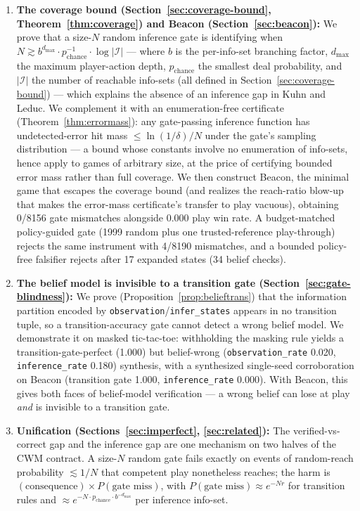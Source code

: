 \documentclass[11pt]{article}
\theoremstyle{remark}
\newcommand{\dmax}{d_{\max}}
\newcommand{\Ireach}{\mathcal{I}}
\begin{document}
\begin{enumerate}
\item \textbf{The coverage bound (Section~\ref{sec:coverage-bound}, Theorem~\ref{thm:coverage}) and Beacon (Section~\ref{sec:beacon}):} We prove that a size-$N$ random inference gate is identifying when $N \gtrsim b^{\dmax} \cdot p_{\text{chance}}^{-1} \cdot \log|\Ireach|$ --- where $b$ is the per-info-set branching factor, $\dmax$ the maximum player-action depth, $p_{\text{chance}}$ the smallest deal probability, and $|\Ireach|$ the number of reachable info-sets (all defined in Section~\ref{sec:coverage-bound}) --- which explains the absence of an inference gap in Kuhn and Leduc. We complement it with an enumeration-free certificate (Theorem~\ref{thm:errormass}): any gate-passing inference function has undetected-error hit mass $\leq \ln(1/\delta)/N$ under the gate's sampling distribution --- a bound whose constants involve no enumeration of info-sets, hence apply to games of arbitrary size, at the price of certifying bounded error mass rather than full coverage. We then construct Beacon, the minimal game that escapes the coverage bound (and realizes the reach-ratio blow-up that makes the error-mass certificate's transfer to play vacuous), obtaining 0/8156 gate mismatches alongside 0.000 play win rate. A budget-matched policy-guided gate (1999 random plus one trusted-reference play-through) rejects the same instrument with 4/8190 mismatches, and a bounded policy-free falsifier rejects after 17 expanded states (34 belief checks).

\item \textbf{The belief model is invisible to a transition gate (Section~\ref{sec:gate-blindness}):} We prove (Proposition~\ref{prop:belieftrans}) that the information partition encoded by \texttt{observation}/\texttt{infer\_states} appears in no transition tuple, so a transition-accuracy gate cannot detect a wrong belief model. We demonstrate it on masked tic-tac-toe: withholding the masking rule yields a transition-gate-perfect (1.000) but belief-wrong (\texttt{observation\_rate} 0.020, \texttt{inference\_rate} 0.180) synthesis, with a synthesized single-seed corroboration on Beacon (transition gate 1.000, \texttt{inference\_rate} 0.000). With Beacon, this gives both faces of belief-model verification --- a wrong belief can lose at play \emph{and} is invisible to a transition gate.

\item \textbf{Unification (Sections~\ref{sec:imperfect}, \ref{sec:related}):} The verified-vs-correct gap and the inference gap are one mechanism on two halves of the CWM contract. A size-$N$ random gate fails exactly on events of random-reach probability $\lesssim 1/N$ that competent play nonetheless reaches; the harm is $(\text{consequence}) \times P(\text{gate miss})$, with $P(\text{gate miss}) \approx e^{-Nr}$ for transition rules and $\approx e^{-N \cdot p_{\text{chance}} \cdot b^{-\dmax}}$ per inference info-set.
\end{enumerate}
\end{document}
